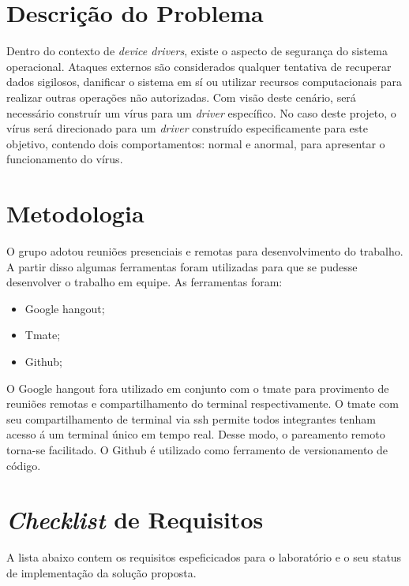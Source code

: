 %

\section{Descrição do Problema}

Dentro do contexto de \textit{device drivers}, existe o aspecto de segurança do sistema operacional.
Ataques externos são considerados qualquer tentativa de recuperar dados sigilosos, danificar
o sistema em sí ou utilizar recursos computacionais para realizar outras operações não autorizadas.
Com visão deste cenário, será necessário construír um vírus para um \textit{driver} específico.
No caso deste projeto, o vírus será direcionado para um \textit{driver} construído especificamente para
este objetivo, contendo dois comportamentos: normal e anormal, para apresentar o
funcionamento do vírus.

\section{Metodologia}

O grupo adotou reuniões presenciais e remotas para desenvolvimento do trabalho. A partir
disso algumas ferramentas foram utilizadas para que se pudesse desenvolver o trabalho em
equipe. As ferramentas foram:

\begin{itemize}
  \item Google hangout;
  \item Tmate;
  \item Github;
\end{itemize}

O Google hangout fora utilizado em conjunto com o tmate para provimento de reuniões remotas
e compartilhamento do terminal respectivamente. O tmate com seu compartilhamento de terminal
via ssh permite todos integrantes tenham acesso á um terminal único em tempo real. Desse modo,
o pareamento remoto torna-se facilitado. O Github é utilizado como ferramento de versionamento
de código. 

\section{\textit{Checklist} de Requisitos}

A lista abaixo contem os requisitos espeficicados para o laboratório e o
seu status de implementação da solução proposta.

